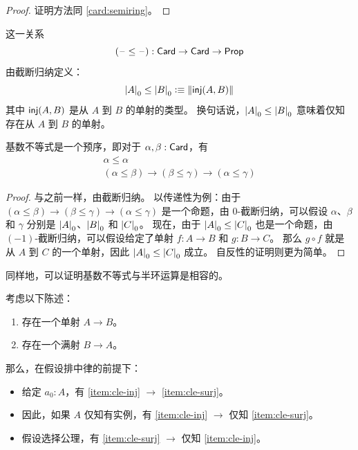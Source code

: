 \begin{proof}
  证明方法同 \cref{card:semiring}。
\end{proof}

\begin{defn}
  这一关系
  \[ (\mathord{\hspace{1pt}\text{--}\hspace{1pt}}\le\mathord{\hspace{1pt}\text{--}\hspace{1pt}}) : \mathsf{Card}\to\mathsf{Card}\to\mathsf{Prop} \]
  由截断归纳定义：
  \[ \mathopen{}\left|A\right|_{0}^{}\mathclose{} \le \mathopen{}\left|B\right|_{0}^{}\mathclose{} \vcentcolon\equiv \mathopen{}\left\Vert \mathsf{inj}(A,B)\right\Vert_{}\mathclose{} \]
  其中 $\mathsf{inj}(A,B)$ 是从 $A$ 到 $B$ 的单射的类型。
  换句话说，$\mathopen{}\left|A\right|_{0}^{}\mathclose{} \le \mathopen{}\left|B\right|_{0}^{}\mathclose{}$ 意味着仅知存在从 $A$ 到 $B$ 的单射。
\end{defn}

\begin{lem}
  基数不等式是一个预序，即对于 $\alpha,\beta:\mathsf{Card}$，有
  \begin{gather*}
    \alpha \le \alpha\\
    (\alpha \le \beta) \to (\beta\le\gamma) \to (\alpha\le\gamma)
  \end{gather*}
\end{lem}

\begin{proof}
  与之前一样，由截断归纳。
  以传递性为例：由于 $(\alpha \le \beta) \to (\beta\le\gamma) \to (\alpha\le\gamma)$ 是一个命题，由 0-截断归纳，可以假设 $\alpha$、$\beta$ 和 $\gamma$ 分别是 $\mathopen{}\left|A\right|_{0}^{}\mathclose{}$、$\mathopen{}\left|B\right|_{0}^{}\mathclose{}$ 和 $\mathopen{}\left|C\right|_{0}^{}\mathclose{}$。
  现在，由于 $\mathopen{}\left|A\right|_{0}^{}\mathclose{} \le \mathopen{}\left|C\right|_{0}^{}\mathclose{}$ 也是一个命题，由 $(-1)$-截断归纳，可以假设给定了单射 $f:A\to B$ 和 $g:B\to C$。
  那么 $g\circ f$ 就是从 $A$ 到 $C$ 的一个单射，因此 $\mathopen{}\left|A\right|_{0}^{}\mathclose{} \le \mathopen{}\left|C\right|_{0}^{}\mathclose{}$ 成立。
  自反性的证明则更为简单。
\end{proof}

同样地，可以证明基数不等式与半环运算是相容的。

\begin{lem}\label{thm:injsurj}
  考虑以下陈述：
  \begin{enumerate}
  \item 存在一个单射 $A\to B$。\label{item:cle-inj}
  \item 存在一个满射 $B\to A$。\label{item:cle-surj}
  \end{enumerate}
  那么，在假设排中律的前提下：
  \begin{itemize}
  \item 给定 $a_0:A$，有 \ref{item:cle-inj} $\to$ \ref{item:cle-surj}。
  \item 因此，如果 $A$ 仅知有实例，有 \ref{item:cle-inj} $\to$ 仅知 \ref{item:cle-surj}。
  \item 假设选择公理，有 \ref{item:cle-surj} $\to$ 仅知 \ref{item:cle-inj}。
  \end{itemize}
\end{lem}


